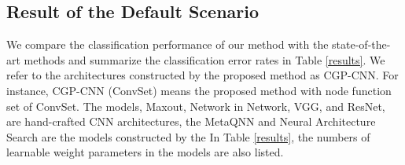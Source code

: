 

\subsection{Result of the Default Scenario}
We compare the classification performance of our method with the state-of-the-art methods and summarize the classification error rates in Table \ref{results}. We refer to the architectures constructed by the proposed method as CGP-CNN. For instance, CGP-CNN (ConvSet) means the proposed method with  node function set of ConvSet. The models, Maxout, Network in Network, VGG, and ResNet, are hand-crafted CNN architectures,  the MetaQNN and Neural Architecture Search are the models constructed by the 
In Table \ref{results}, the numbers of learnable weight parameters in the models are also listed.

